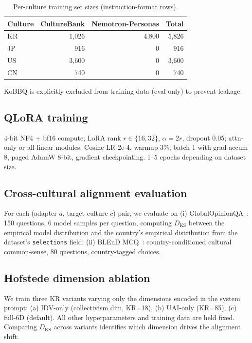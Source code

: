\documentclass{article}
\begin{document}
\begin{table}[t]
\centering
\small
\caption{Per-culture training set sizes (instruction-format rows).}
\label{tab:data}
\begin{tabular}{lrrr}
\toprule
Culture & CultureBank & Nemotron-Personas & Total \\
\midrule
KR & 1,026 & 4,800 & 5,826 \\
JP & 916   & 0     & 916 \\
US & 3,600 & 0     & 3,600 \\
CN & 740   & 0     & 740 \\
\bottomrule
\end{tabular}
\end{table}

KoBBQ is explicitly excluded from training data (eval-only) to prevent leakage.

\subsection{QLoRA training}
4-bit NF4 + bf16 compute; LoRA rank $r\in\{16,32\}$, $\alpha=2r$, dropout 0.05; attn-only or all-linear modules. Cosine LR 2e-4, warmup 3\%, batch 1 with grad-accum 8, paged AdamW 8-bit, gradient checkpointing. 1--5 epochs depending on dataset size.

\subsection{Cross-cultural alignment evaluation}
For each (adapter $a$, target culture $c$) pair, we evaluate on (i) GlobalOpinionQA~\cite{durmus2023global}: 150 questions, 6 model samples per question, computing $D_\mathrm{KS}$ between the empirical model distribution and the country's empirical distribution from the dataset's \verb|selections| field; (ii) BLEnD MCQ~\cite{myung2024blend}: country-conditioned cultural common-sense, 80 questions, country-tagged choices.

\subsection{Hofstede dimension ablation}
We train three KR variants varying only the dimensions encoded in the system prompt: (a) IDV-only (collectivism dim, KR=18), (b) UAI-only (KR=85), (c) full-6D (default). All other hyperparameters and training data are held fixed. Comparing $D_\mathrm{KS}$ across variants identifies which dimension drives the alignment shift.
\end{document}
